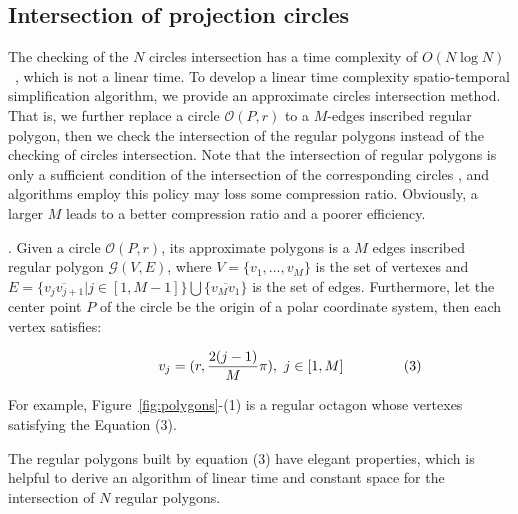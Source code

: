 \subsection{Intersection of projection circles }

The checking of the $N$ circles intersection has a time complexity of \textcolor[rgb]{1.00,0.00,0.00}{${O(N\log N)}$~\cite{Shamos:Circle}}, which is not a linear time.
To develop a linear time complexity spatio-temporal simplification algorithm, we provide an approximate circles intersection method.
That is, we further replace a circle $\mathcal{O}(P, r)$ to a $M$-edges inscribed regular polygon,
then we check the intersection of the regular polygons instead of the checking of circles intersection.
Note that the intersection of regular polygons is only a sufficient condition of the intersection of the corresponding circles , and
algorithms employ this policy may loss some compression ratio. Obviously, a larger $M$ leads to a better compression ratio and a poorer
efficiency.

.
Given a circle $\mathcal{O}(P, r)$, its approximate polygons is a $M$ edges inscribed regular polygon $\mathcal{G}(V, E)$,
where $V=\{v_1, \ldots, v_{M}\}$ is the set of vertexes and
$E= \{\overline{v_jv_{j+1}}| j\in [1,M-1]\} \bigcup \{\overline{v_Mv_1}\}$ is the set of edges.
Furthermore, let the center point $P$ of the circle be the origin of a polar coordinate system, then each vertex satisfies:

\vspace{-2ex}
\begin{equation*}
\label{equ-regular-polygon}
    \begin{aligned}
        \hspace{10ex}  v_j = (r, \frac{2(j-1)}{M}\pi), ~j \in [1, M]    \hspace{10ex} (3)\\
    \end{aligned}
\end{equation*}
\vspace{-1ex}


For example, Figure~\ref{fig:polygons}-(1) is a regular octagon whose vertexes satisfying the Equation (3).

The regular polygons built by equation (3) have elegant properties, which is helpful to derive an algorithm of linear time and constant space
for the intersection of $N$ regular polygons.


